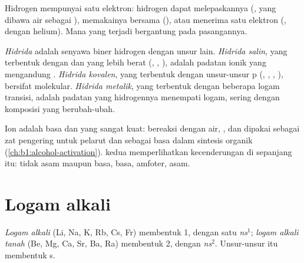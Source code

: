 Hidrogen mempunyai satu elektron: hidrogen dapat melepaskannya (,
yang dibawa air sebagai ), memakainya bersama (),
atau menerima satu elektron (, dengan  helium).
Mana yang terjadi bergantung pada pasangannya.

\begin{definition}[Hidrida]\label{def:b1:s-block:hydride}
\emph{Hidrida} adalah senyawa biner hidrogen dengan unsur
lain. \emph{Hidrida salin}, yang terbentuk dengan
 dan  yang lebih berat (, ,
), adalah padatan ionik yang mengandung . \emph{Hidrida
kovalen}, yang terbentuk dengan unsur-unsur  p
(, , , ), bersifat molekular.
\emph{Hidrida metalik}, yang terbentuk dengan
beberapa logam transisi, adalah padatan yang hidrogennya menempati   logam, sering dengan komposisi yang berubah-ubah.
\end{definition}

Ion  adalah basa dan  yang sangat kuat: 
bereaksi dengan air, , dan dipakai sebagai zat
pengering untuk pelarut dan sebagai basa dalam sintesis organik
(\cref{ch:b1:alcohol-activation}).   kedua
memperlihatkan kecenderungan  di sepanjang  itu:
 tidak asam maupun basa,  basa,  amfoter, 
asam.

\section{Logam alkali}

\begin{definition}\label{def:b1:s-block:families}
\emph{Logam alkali} (Li, Na, K, Rb, Cs, Fr) membentuk
 1, dengan satu  \textit{ns}$^1$;
\emph{logam alkali tanah} (Be, Mg, Ca, Sr, Ba,
Ra) membentuk  2, dengan \textit{ns}$^2$. Unsur-unsur itu
membentuk  s.
\end{definition}

